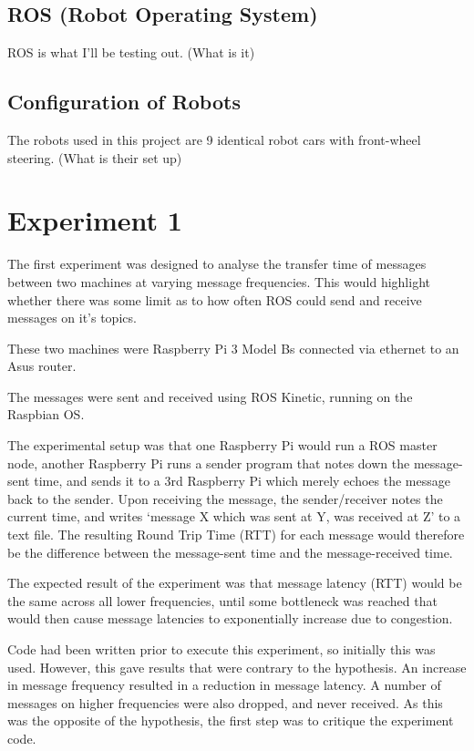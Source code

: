 \documentclass{l4proj}
\begin{document}
\section{ROS (Robot Operating System)}

ROS is what I'll be testing out. (What is it)

\section{Configuration of Robots}

The robots used in this project are 9 identical robot cars with front-wheel steering. (What is their set up)


\chapter{Experiment 1}

The first experiment was designed to analyse the transfer time of messages between two machines at varying message frequencies. This would highlight whether there was some limit as to how often ROS could send and receive messages on it's topics.

These two machines were Raspberry Pi 3 Model Bs connected via ethernet to an Asus router.

The messages were sent and received using ROS Kinetic, running on the Raspbian OS.

The experimental setup was that one Raspberry Pi would run a ROS master node, another Raspberry Pi runs a sender program that notes down the message-sent time, and sends it to a 3rd Raspberry Pi which merely echoes the message back to the sender. Upon receiving the message, the sender/receiver notes the current time, and writes `message X which was sent at Y, was received at Z' to a text file. The resulting Round Trip Time (RTT) for each message would therefore be the difference between the message-sent time and the message-received time.

The expected result of the experiment was that message latency (RTT) would be the same across all lower frequencies, until some bottleneck was reached that would then cause message latencies to exponentially increase due to congestion.

Code had been written prior to execute this experiment, so initially this was used\cite{Experiment1InitialCode}. However, this gave results that were contrary to the hypothesis. An increase in message frequency resulted in a reduction in message latency. A number of messages on higher frequencies were also dropped, and never received. As this was the opposite of the hypothesis, the first step was to critique the experiment code.
\end{document}
